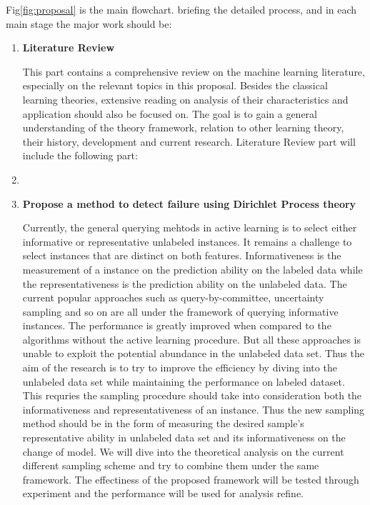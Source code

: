 Fig\ref{fig:proposal} is the main flowchart.  briefing the detailed process, and in each main stage the major work should be:
\begin{enumerate}
 \item \textbf{Literature Review}
 
 This part contains a comprehensive review on the machine learning literature, especially on the relevant topics in this proposal. Besides the classical learning theories, extensive reading on analysis of their characteristics and application should also be focused on. The goal is to gain a general understanding of the theory framework, relation to other learning theory,  their history, development and current research. 
 Literature Review part will include the following part:
 \item \textbf{}
 
 \item \textbf{Propose a method to detect failure using Dirichlet Process theory}
 
 Currently, the general querying mehtods in active learning is to select either informative or representative unlabeled instances\cite{huang2010active}. It remains a challenge to select instances that are distinct on both features\cite{huang2010active}. Informativeness is the measurement of a instance on the prediction ability on the labeled data while the representativeness is the prediction ability on the unlabeled data. The current popular approaches such as query-by-committee\cite{Settles2010}, uncertainty sampling\cite{Settles2010} and so on are all under the framework of querying informative instances. The performance is greatly improved when compared to the algorithms without the active learning procedure. But all these approaches is unable to exploit the potential abundance in the unlabeled data set. Thus the aim of the research is to try to improve the efficiency by diving into the unlabeled data set while maintaining the performance on labeled dataset. This requries the sampling procedure should take into consideration both the informativeness and representativeness of an instance. Thus the new sampling method should be in the form of measuring the desired sample's representative ability in unlabeled data set and its informativeness on the change of model. We will dive into the theoretical analysis on the current different sampling scheme and try to combine them under the same framework. The effectiness of the proposed framework will be tested through experiment and the performance will be used for analysis refine.
 

\end{enumerate}
